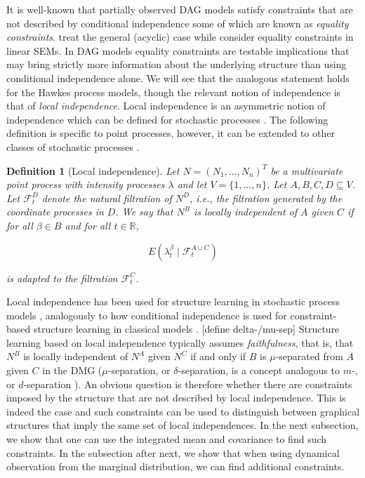 \documentclass[accepted]{uai2021} %
\newtheorem{defn}[thm]{Definition}
\begin{document}
It is well-known that partially observed DAG models satisfy 
constraints that 
are not described by conditional independence some of which are known as 
\emph{equality constraints}. \cite{richardson2017} treat the general (acyclic) 
case 
while \cite{chen2014, chenNIPS2016} consider equality constraints in linear 
SEMs. In DAG models equality constraints are testable implications that may 
bring strictly more information about the underlying structure than using 
conditional independence alone. We will see that the analogous statement holds 
for the Hawkes process models, though the relevant notion of independence is 
that of \emph{local independence}. Local independence is an asymmetric notion 
of independence which can be defined 
for stochastic processes \citep{schweder1970, aalen1987, didelez2000, 
didelez2008}. The following definition is specific to point processes, however, 
it can be extended to other classes of stochastic processes 
\citep{aalen1987,didelez2006,mogensenUAI2018,mogensen2018}.

\begin{defn}[Local independence]
	Let $N = (N_1,\ldots,N_n)^T$ be a multivariate point process with intensity 
	processes $\lambda$ and let $V=\{1,\ldots,n\}$. Let $A,B,C,D \subseteq V$. 
	Let $\mathcal{F}_t^D$ denote the natural filtration of $N^D$, i.e., the 
	filtration generated by the coordinate processes in $D$. We say that $N^B$ 
	is \emph{locally independent of $A$ given $C$} if for all $\beta\in B$ and 
	for all $t\in \mathbb{R}$,
	
	$$
	E(\lambda_t^\beta \mid \mathcal{F}_t^{A\cup C})
	$$
	
	is adapted to the filtration $\mathcal{F}_t^C$.
	\label{def:li}
\end{defn}

Local independence has been used for structure learning in stochastic process 
models 
\citep{meek2014, mogensenUAI2018, thams2019, mogensenUAI2020}, analogously to 
how conditional independence is used for 
constraint-based structure learning in classical models \citep{spirtes1993, 
spirtesSearchChapHandbook}. 
[define 
delta-/mu-sep] Structure learning based on local independence typically assumes 
\emph{faithfulness}, that is, that $N^B$ is locally independent of $N^A$ given 
$N^C$ if and only if $B$ is $\mu$-separated from $A$ given $C$ in the DMG 
($\mu$-separation, or $\delta$-separation, is a concept analogous to $m$-, or 
$d$-separation \citep{didelez2000, didelez2008, mogensen2018}). An obvious 
question is therefore whether there are constraints imposed by the 
 structure that are not described by local independence. This is indeed the 
 case 
 and such constraints can be used to distinguish between graphical structures 
 that imply the same set of local independences. In the next subsection, we 
 show that one can use the integrated mean and covariance to find such 
 constraints. In the subsection after next, we show that when using
 dynamical observation from the marginal distribution, we can find additional 
 constraints.
\end{document}
